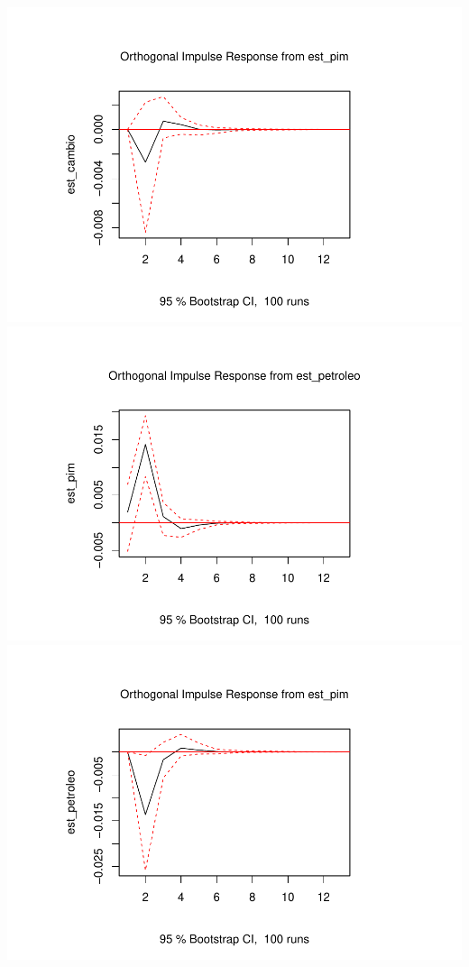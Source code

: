 \documentclass[12pt]{article}
\begin{document}
\includegraphics{teste_en_files/figure-latex/unnamed-chunk-14-10.pdf}
\includegraphics{teste_en_files/figure-latex/unnamed-chunk-14-11.pdf}
\includegraphics{teste_en_files/figure-latex/unnamed-chunk-14-12.pdf}



\end{document}
